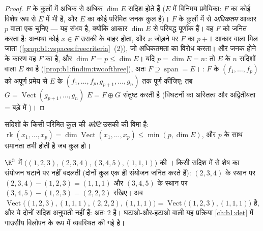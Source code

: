 \begin{proof}
$F$ के  कुलों में अधिक से अधिक $\dim E$ सदिश होते हैं ($E$ में
विनिमय प्रमेयिका: $F$ का कोई  विशेष रूप से $E$ में भी 
है, और $E$ का कोई परिमित जनक कुल है)। $F$ के  कुलों में से
\emph{अधिकतम} आकार $p$ वाला एक चुनिए --- यह संभव है, क्योंकि आकार $\dim E$
से परिबद्ध पूर्णांक हैं। वह $F$ को जनित करता है: अन्यथा कोई $x \in F$ उसकी
 के बाहर होता, और $x$ जोड़ने पर $F$ का $p + 1$ आकार वाला  मिल जाता (\cref{prop:b1:vspaces:freecriteria}~(2)), जो अधिकतमता का विरोध
करता।  और जनक होने के कारण वह $F$ का  है, और $\dim F = p \leq
\dim E$। यदि $p = \dim E = n$: तो $E$ के $n$ सदिशों वाला  $E$ का
 है (\cref{prop:b1:findim:twoofthree}), अतः $F \supseteq
\operatorname{span} = E$। : $F$ के  $(f_1, \dots, f_p)$ को अपूर्ण
 प्रमेय से $E$ के  $(f_1, \dots, f_p, g_{p+1}, \dots, g_n)$ तक पूर्ण
कीजिए; तब $G = \operatorname{Vect}(g_{p+1}, \dots, g_n)$ $E = F \oplus G$
संतुष्ट करती है (विघटनों का अस्तित्व और अद्वितीयता = बड़े  में
)।
\end{proof}

\begin{definition}[किसी कुल की कोटि]\label{def:b1:findim:rank}
सदिशों के किसी परिमित कुल की \emph{कोटि} उसकी  की विमा है: $\operatorname{rk}(x_1, \dots, x_p) = \dim
\operatorname{Vect}(x_1, \dots, x_p) \leq \min(p, \dim E)$, और $p$ के साथ
समानता तभी होती है जब कुल  हो।
\end{definition}

\begin{example}[विलोपन से कोटि की संगणना]
\label{ex:b1:findim:rankcomputation}
$\R^3$ में $\bigl((1,2,3), (2,3,4), (3,4,5), (1,1,1)\bigr)$ की । किसी
सदिश में से शेष का संयोजन घटाने पर  नहीं बदलती (दोनों कुल एक ही
संयोजन जनित करते हैं): $(2,3,4)$ के स्थान पर $(2,3,4) - (1,2,3) = (1,1,1)$
और $(3,4,5)$ के स्थान पर $(3,4,5) - (1,2,3) = (2,2,2)$ रखिए। अब 
$\operatorname{Vect}\bigl((1,2,3), (1,1,1), (2,2,2), (1,1,1)\bigr) =
\operatorname{Vect}\bigl((1,2,3), (1,1,1)\bigr)$ है, और ये दोनों सदिश
अनुपाती नहीं हैं: अतः  $2$ है। घटाओ-और-हटाओ वाली यह प्रक्रिया
\cref{ch:b1:det} में गाउसीय विलोपन के रूप में व्यवस्थित की गई है।
\end{example}

